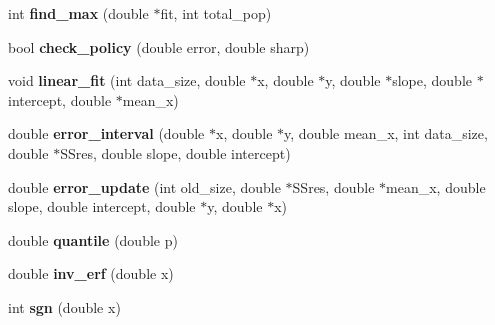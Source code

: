 \begin{DoxyCompactItemize}
\item 
\hypertarget{classOptAlg_aeba3c4b026944928e9353ea49a3f2980}{}int {\bfseries find\+\_\+max} (double $\ast$fit, int total\+\_\+pop)\label{classOptAlg_aeba3c4b026944928e9353ea49a3f2980}

\item 
\hypertarget{classOptAlg_ab7f21c9001e6769c4505a6379f15590a}{}bool {\bfseries check\+\_\+policy} (double error, double sharp)\label{classOptAlg_ab7f21c9001e6769c4505a6379f15590a}

\item 
\hypertarget{classOptAlg_a41d6fd881634bf52b87bcaec6d210c44}{}void {\bfseries linear\+\_\+fit} (int data\+\_\+size, double $\ast$x, double $\ast$y, double $\ast$slope, double $\ast$intercept, double $\ast$mean\+\_\+x)\label{classOptAlg_a41d6fd881634bf52b87bcaec6d210c44}

\item 
\hypertarget{classOptAlg_a01eee569fc97269be39dee4d2b79bcb3}{}double {\bfseries error\+\_\+interval} (double $\ast$x, double $\ast$y, double mean\+\_\+x, int data\+\_\+size, double $\ast$S\+Sres, double slope, double intercept)\label{classOptAlg_a01eee569fc97269be39dee4d2b79bcb3}

\item 
\hypertarget{classOptAlg_ab4ba2cac1f5b51fb5fb715b780805825}{}double {\bfseries error\+\_\+update} (int old\+\_\+size, double $\ast$S\+Sres, double $\ast$mean\+\_\+x, double slope, double intercept, double $\ast$y, double $\ast$x)\label{classOptAlg_ab4ba2cac1f5b51fb5fb715b780805825}

\item 
\hypertarget{classOptAlg_a36a79062b361107b45689fecc4ad9585}{}double {\bfseries quantile} (double p)\label{classOptAlg_a36a79062b361107b45689fecc4ad9585}

\item 
\hypertarget{classOptAlg_abd15aea33f75b4da44eeea29bb553f82}{}double {\bfseries inv\+\_\+erf} (double x)\label{classOptAlg_abd15aea33f75b4da44eeea29bb553f82}

\item 
\hypertarget{classOptAlg_a38495fed6c3a7ed75df069109465f405}{}int {\bfseries sgn} (double x)\label{classOptAlg_a38495fed6c3a7ed75df069109465f405}

\end{DoxyCompactItemize}
